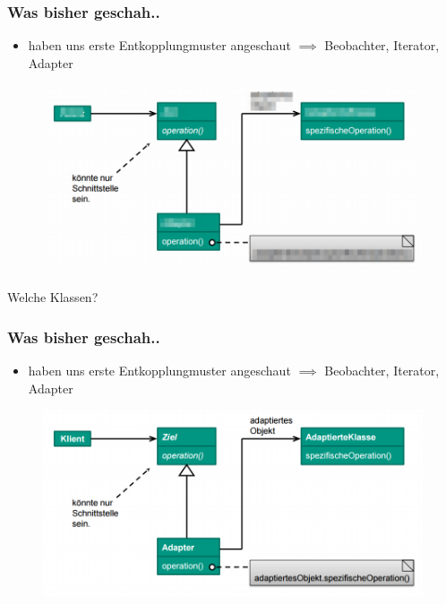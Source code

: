 \documentclass[18pt]{beamer}
\begin{document}
	\begin{frame}
		\frametitle{Was bisher geschah..}
		\begin{itemize}
			\item haben uns erste Entkopplungmuster angeschaut
			\linebreak $\implies$ Beobachter, Iterator, Adapter
		\end{itemize}
		\begin{figure}
			\includegraphics[scale=0.33]{./pics/tut4/adap-obj-mod.png}
		\end{figure}
		Welche Klassen?
	\end{frame}
	
	\begin{frame}
		\frametitle{Was bisher geschah..}
		\begin{itemize}
			\item haben uns erste Entkopplungmuster angeschaut
			\linebreak $\implies$ Beobachter, Iterator, Adapter
		\end{itemize}
		\begin{figure}
			\includegraphics[scale=0.45]{./pics/tut3/adap-obj.png}
		\end{figure}
	\end{frame}
	
\end{document}
